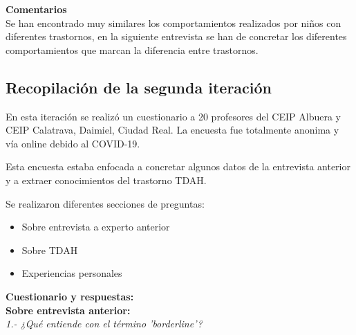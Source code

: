 \documentclass[letterpaper,12pt]{article}
\begin{document}
\begin{flushleft}
\textbf{Comentarios} \\
Se han encontrado muy similares los comportamientos realizados por niños
con diferentes trastornos, en la siguiente entrevista se han de concretar los
diferentes comportamientos que marcan la diferencia entre trastornos.\\
\end{flushleft}


\subsection{Recopilación de la segunda iteración}
\begin{flushleft}
En esta iteración se realizó un cuestionario a 20 profesores del CEIP Albuera y CEIP Calatrava, Daimiel, Ciudad Real. La encuesta fue totalmente anonima y vía online debido al COVID-19. 

\end{flushleft}
\begin{flushleft}
Esta encuesta estaba enfocada a concretar algunos datos de la entrevista anterior y a extraer conocimientos del trastorno TDAH. 
\end{flushleft}
\begin{flushleft}

Se realizaron diferentes secciones de preguntas:
\end{flushleft}
\begin{itemize}
\item Sobre entrevista a experto anterior
\item Sobre TDAH
\item Experiencias personales
\end{itemize} 
\newpage
\begin{flushleft}
\textbf{Cuestionario y respuestas:} \\
\textbf{Sobre entrevista anterior:} \\
\textit{1.- ¿Qué entiende con el término 'borderline'?}\\
\end{flushleft}
\begin{center}
 \\
\end{center}
\end{document}
